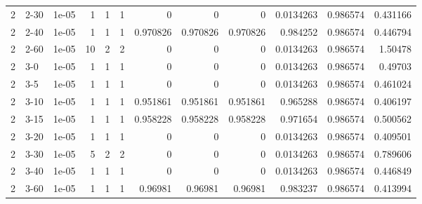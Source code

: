 \begin{tabular}{rlrrrrrrrrrr}
     2 & 2-30   &      1e-05 &           1 &                 1 &                 1 &        0        &        0        &         0        &        0.0134263 &               0.986574 &           0.431166 \\
     2 & 2-40   &      1e-05 &           1 &                 1 &                 1 &        0.970826 &        0.970826 &         0.970826 &        0.984252  &               0.986574 &           0.446794 \\
     2 & 2-60   &      1e-05 &          10 &                 2 &                 2 &        0        &        0        &         0        &        0.0134263 &               0.986574 &           1.50478  \\
     2 & 3-0    &      1e-05 &           1 &                 1 &                 1 &        0        &        0        &         0        &        0.0134263 &               0.986574 &           0.49703  \\
     2 & 3-5    &      1e-05 &           1 &                 1 &                 1 &        0        &        0        &         0        &        0.0134263 &               0.986574 &           0.461024 \\
     2 & 3-10   &      1e-05 &           1 &                 1 &                 1 &        0.951861 &        0.951861 &         0.951861 &        0.965288  &               0.986574 &           0.406197 \\
     2 & 3-15   &      1e-05 &           1 &                 1 &                 1 &        0.958228 &        0.958228 &         0.958228 &        0.971654  &               0.986574 &           0.500562 \\
     2 & 3-20   &      1e-05 &           1 &                 1 &                 1 &        0        &        0        &         0        &        0.0134263 &               0.986574 &           0.409501 \\
     2 & 3-30   &      1e-05 &           5 &                 2 &                 2 &        0        &        0        &         0        &        0.0134263 &               0.986574 &           0.789606 \\
     2 & 3-40   &      1e-05 &           1 &                 1 &                 1 &        0        &        0        &         0        &        0.0134263 &               0.986574 &           0.446849 \\
     2 & 3-60   &      1e-05 &           1 &                 1 &                 1 &        0.96981  &        0.96981  &         0.96981  &        0.983237  &               0.986574 &           0.413994 \\

\end{tabular}
